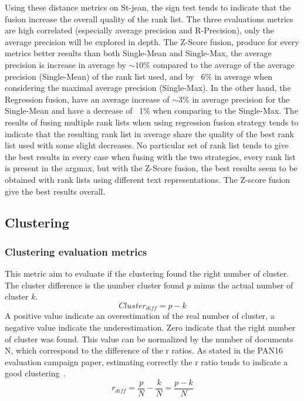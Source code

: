 Using these distance metrics on St-jean, the sign test tends to indicate that the fusion increase the overall quality of the rank list.
The three evaluations metrics are high correlated (especially average precision and R-Precision), only the average precision will be explored in depth.
The Z-Score fusion, produce for every metrics better results than both Single-Mean and Single-Max, the average precision is increase in average by $\sim 10$\% compared to the average of the average precision (Single-Mean) of the rank list used, and by ~6\% in average when considering the maximal average precision (Single-Max).
In the other hand, the Regression fusion, have an average increase of $\sim 3$\% in average precision for the Single-Mean and have a decrease of ~1\% when comparing to the Single-Max.
The results of fusing multiple rank lists when using regression fusion strategy tends to indicate that the resulting rank list in average share the quality of the best rank list used with some slight decreases.
No particular set of rank list tends to give the best results in every case when fusing with the two strategies, every rank list is present in the argmax, but with the Z-Score fusion, the best results seem to be obtained with rank lists using different text representations.
The Z-score fusion give the best results overall.

\subsection{Clustering}

\subsubsection{Clustering evaluation metrics}

\begin{definition}
  This metric aim to evaluate if the clustering found the right number of cluster.
  The cluster difference is the number cluster found $p$ minus the actual number of cluster $k$.
  \begin{equation}
    Cluster_{diff} = p - k
  \end{equation}
  A positive value indicate an overestimation of the real number of cluster, a negative value indicate the underestimation.
  Zero indicate that the right number of cluster was found.
  This value can be normalized by the number of documents N, which correspond to the difference of the r ratios.
  As stated in the PAN16 evaluation campaign paper, estimating correctly the r ratio tends to indicate a good clustering~\cite{pan16}.
  \begin{equation}
    r_{diff} = \frac{p}{N} - \frac{k}{N} = \frac{p - k}{N}
  \end{equation}
\end{definition}

